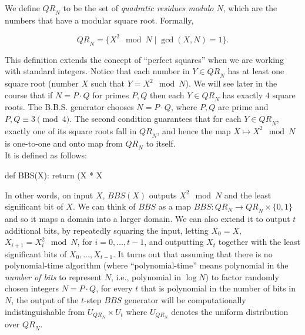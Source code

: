 We define \(\ensuremath{\mathit{QR}}_N\) to be the set of
\emph{quadratic residues modulo \(N\)}, which are the numbers that have
a modular square root. Formally,

\begin{equation*}
\ensuremath{\mathit{QR}}_N=\{X^2 \mod N \mid \gcd(X,N )=1\}.
\end{equation*}

This definition extends the concept of ``perfect squares'' when we are
working with standard integers. Notice that each number in
\(Y \in \ensuremath{\mathit{QR}}_N\) has at least one square root
(number \(X\) such that \(Y = X^2 \mod N\)). We will see later in the
course that if \(N = P\cdot Q\) for primes \(P,Q\) then each
\(Y\in \ensuremath{\mathit{QR}}_N\) has exactly \(4\) square roots. The
B.B.S. generator chooses \(N=P\cdot Q\), where \(P,Q\) are prime and
\(P,Q\equiv 3\pmod{4}\). The second condition guarantees that for each
\(Y\in \ensuremath{\mathit{QR}}_N\), exactly one of its square roots
fall in \(\ensuremath{\mathit{QR}}_N\), and hence the map
\(X \mapsto X^2 \mod N\) is one-to-one and onto map from
\(\ensuremath{\mathit{QR}}_N\) to itself.\\
It is defined as follows:

\begin{code}
def BBS(X):
    return (X * X %
\end{code}

In other words, on input \(X\), \(\ensuremath{\mathit{BBS}}(X)\) outputs
\(X^2 \mod N\) and the least significant bit of \(X\). We can think of
\(\ensuremath{\mathit{BBS}}\) as a map
\(\ensuremath{\mathit{BBS}}:QR_N \rightarrow \ensuremath{\mathit{QR}}_N \times \{0,1\}\)
and so it maps a domain into a larger domain. We can also extend it to
output \(t\) additional bits, by repeatedly squaring the input, letting
\(X_0 = X\), \(X_{i+1} = X_i^2 \mod N\), for \(i=0,\ldots,{t-1}\), and
outputting \(X_t\) together with the least significant bits of
\(X_0,\ldots,X_{t-1}\). It turns out that assuming that there is no
polynomial-time algorithm (where ``polynomial-time'' means polynomial in
the \emph{number of bits} to represent \(N\), i.e., polynomial in
\(\log N\)) to factor randomly chosen integers \(N=P\cdot Q\), for every
\(t\) that is polynomial in the number of bits in \(N\), the output of
the \(t\)-step \(\ensuremath{\mathit{BBS}}\) generator will be
computationally indistinguishable from \(U_{QR_N} \times U_t\) where
\(U_{QR_N}\) denotes the uniform distribution over
\(\ensuremath{\mathit{QR}}_N\).

